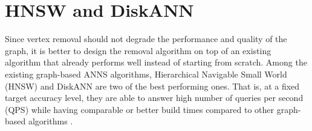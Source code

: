 \section{HNSW and DiskANN}

Since vertex removal should not degrade the performance and quality of the graph, it is better to design the removal algorithm on top of an existing algorithm that already performs well instead of starting from scratch. Among the existing graph-based ANNS algorithms, Hierarchical Navigable Small World (HNSW) \cite{hnsw} and DiskANN \cite{diskann-paper} are two of the best performing ones. That is, at a fixed target accuracy level, they are able to answer high number of queries per second (QPS) \cite{annscaling,survey2} while having comparable or better build times compared to other graph-based algorithms \cite{annscaling}.

